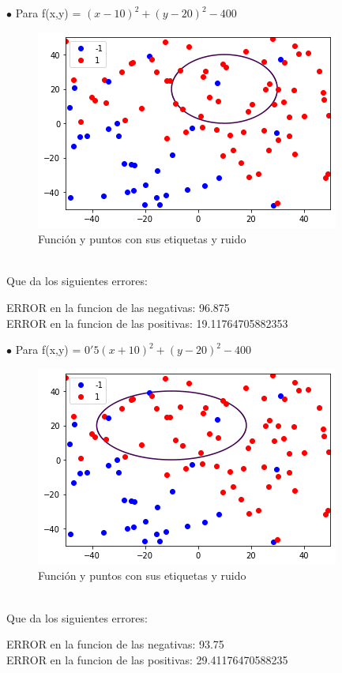 \documentclass[12pt]{article}
\begin{document}
$ \bullet $ Para f(x,y) = $ (x - 10)^{2} + (y - 20)^{2} - 400 $\\
\begin{figure}[h]
\centering
\includegraphics[scale=0.75]{Images/Ej2ca.png} 
\caption{Función y puntos con sus etiquetas y ruido}
\label{etiqueta}
\end{figure}
\\
Que da los siguientes errores:
\begin{center}
ERROR en la funcion de las negativas: 96.875\\
ERROR en la funcion de las positivas: 19.11764705882353
\end{center}

$ \bullet $ Para f(x,y) = $ 0'5(x + 10)^{2} + (y - 20)^{2} - 400 $\\
\begin{figure}[h]
\centering
\includegraphics[scale=0.75]{Images/Ej2cb.png} 
\caption{Función y puntos con sus etiquetas y ruido}
\label{etiqueta}
\end{figure}
\\
Que da los siguientes errores:
\begin{center}
ERROR en la funcion de las negativas: 93.75\\
ERROR en la funcion de las positivas: 29.41176470588235
\end{center}
\end{document}

